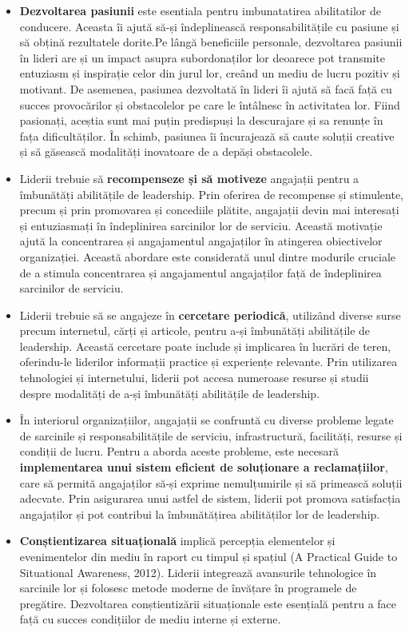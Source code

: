 \documentclass[a4paper, 12pt]{article}
\begin{document}
	\begin{itemize}
	\item\textbf{ Dezvoltarea pasiunii} este esentiala pentru imbunatatirea abilitatilor de conducere. Aceasta îi ajută să-și îndeplinească responsabilitățile cu pasiune și să obțină rezultatele dorite.Pe lângă beneficiile personale, dezvoltarea pasiunii în lideri are și un impact asupra subordonaților lor deoarece pot transmite entuziasm și inspirație celor din jurul lor, creând un mediu de lucru pozitiv și motivant. De asemenea, pasiunea dezvoltată în lideri îi ajută să facă față cu succes provocărilor și obstacolelor pe care le întâlnesc în activitatea lor. Fiind pasionați, aceștia sunt mai puțin predispuși la descurajare și  sa renunțe în fața dificultăților. În schimb, pasiunea îi încurajează să caute soluții creative și să găsească modalități inovatoare de a depăși obstacolele.

	\item Liderii trebuie să \textbf{recompenseze și să motiveze} angajații pentru a îmbunătăți abilitățile de leadership. Prin oferirea de recompense și stimulente, precum și prin promovarea și concediile plătite, angajații devin mai interesați și entuziasmați în îndeplinirea sarcinilor lor de serviciu. Această motivație ajută la concentrarea și angajamentul angajaților în atingerea obiectivelor organizației. Această abordare este considerată unul dintre modurile cruciale de a stimula concentrarea și angajamentul angajaților față de îndeplinirea sarcinilor de serviciu.

	\item Liderii trebuie să se angajeze în \textbf{cercetare periodică}, utilizând diverse surse precum internetul, cărți și articole, pentru a-și îmbunătăți abilitățile de leadership. Această cercetare poate include și implicarea în lucrări de teren, oferindu-le liderilor informații practice și experiențe relevante. Prin utilizarea tehnologiei și internetului, liderii pot accesa numeroase resurse și studii despre modalități de a-și îmbunătăți abilitățile de leadership.


	\item În interiorul organizațiilor, angajații se confruntă cu diverse probleme legate de sarcinile și responsabilitățile de serviciu, infrastructură, facilități, resurse și condiții de lucru. Pentru a aborda aceste probleme, este necesară \textbf{implementarea unui sistem eficient de soluționare a reclamațiilor}, care să permită angajaților să-și exprime nemulțumirile și să primească soluții adecvate. Prin asigurarea unui astfel de sistem, liderii pot promova satisfacția angajaților și pot contribui la îmbunătățirea abilităților lor de leadership.

	\item \textbf{Conștientizarea situațională} implică percepția elementelor și evenimentelor din mediu în raport cu timpul și spațiul (A Practical Guide to Situational Awareness, 2012). Liderii integrează avansurile tehnologice în sarcinile lor și folosesc metode moderne de învățare în programele de pregătire. Dezvoltarea conștientizării situaționale este esențială pentru a face față cu succes condițiilor de mediu interne și externe. 

	\end{itemize}
\end{document}
